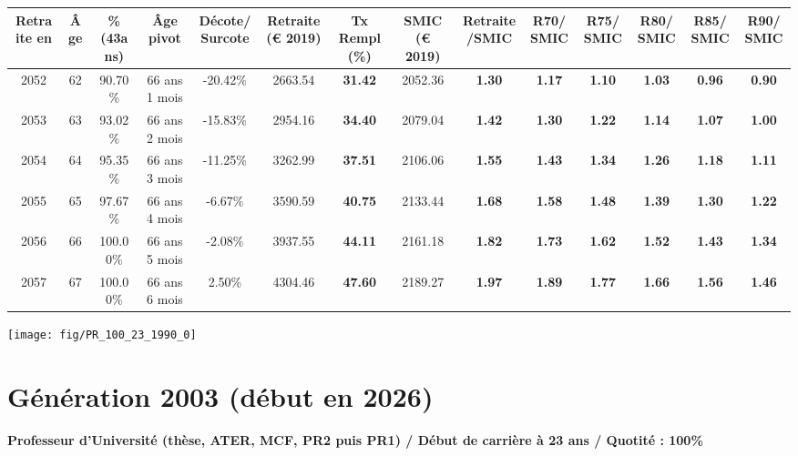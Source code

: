 \begin{adjustbox}{max width=\textwidth} 
\begin{tabular}[htb]{|c|c||c|c|c||c|c||c|c||c|c|c|c|c|} 
\hline 
 Retraite en &  Âge &  \%(43ans) &  Âge pivot &  Décote/Surcote &  Retraite (\euro{} 2019) &  Tx Rempl(\%) &  SMIC (\euro{} 2019) &  Retraite/SMIC &  R70/SMIC &  R75/SMIC &  R80/SMIC &  R85/SMIC &  R90/SMIC \\ 
\hline \hline 
 2052 &  62 &  90.70\% &  66 ans 1 mois &  -20.42\% &  2663.54 &  {\bf 31.42} &  2052.36 &  {\bf 1.30} &  {\bf 1.17} &  {\bf 1.10} &  {\bf 1.03} &  {\bf {\color{red} 0.96}} &  {\bf {\color{red} 0.90}} \\ 
\hline 
 2053 &  63 &  93.02\% &  66 ans 2 mois &  -15.83\% &  2954.16 &  {\bf 34.40} &  2079.04 &  {\bf 1.42} &  {\bf 1.30} &  {\bf 1.22} &  {\bf 1.14} &  {\bf 1.07} &  {\bf 1.00} \\ 
\hline 
 2054 &  64 &  95.35\% &  66 ans 3 mois &  -11.25\% &  3262.99 &  {\bf 37.51} &  2106.06 &  {\bf 1.55} &  {\bf 1.43} &  {\bf 1.34} &  {\bf 1.26} &  {\bf 1.18} &  {\bf 1.11} \\ 
\hline 
 2055 &  65 &  97.67\% &  66 ans 4 mois &  -6.67\% &  3590.59 &  {\bf 40.75} &  2133.44 &  {\bf 1.68} &  {\bf 1.58} &  {\bf 1.48} &  {\bf 1.39} &  {\bf 1.30} &  {\bf 1.22} \\ 
\hline 
 2056 &  66 &  100.00\% &  66 ans 5 mois &  -2.08\% &  3937.55 &  {\bf 44.11} &  2161.18 &  {\bf 1.82} &  {\bf 1.73} &  {\bf 1.62} &  {\bf 1.52} &  {\bf 1.43} &  {\bf 1.34} \\ 
\hline 
 2057 &  67 &  100.00\% &  66 ans 6 mois &  2.50\% &  4304.46 &  {\bf 47.60} &  2189.27 &  {\bf 1.97} &  {\bf 1.89} &  {\bf 1.77} &  {\bf 1.66} &  {\bf 1.56} &  {\bf 1.46} \\ 
\hline 
\hline 
\end{tabular} 
\end{adjustbox} 
 
 \vspace{0.1cm} 

 {\hspace{-2.2cm}\texttt{[image: fig/PR\_100\_23\_1990\_0]}} 

\newpage 
 
\section{Génération 2003 (début en 2026)\label{PR_100_23_2003_0}} 
 
{\bf \noindent Professeur d'Université (thèse, ATER, MCF, PR2 puis PR1) / Début de carrière à 23 ans / Quotité : 100\%}  ~ 

